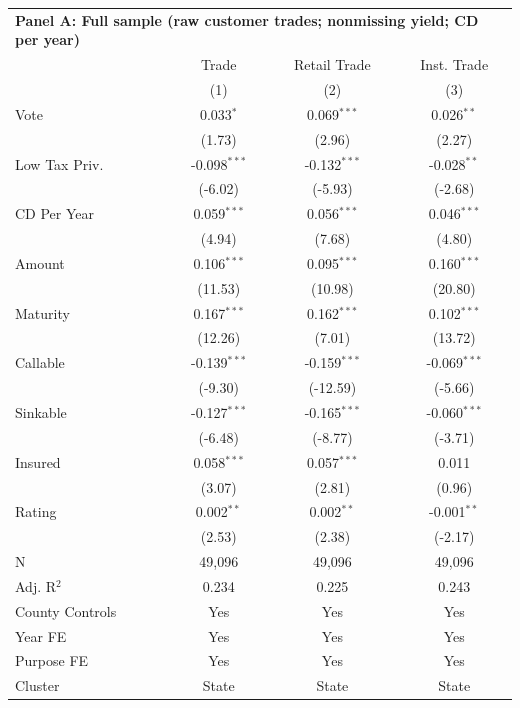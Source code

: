 \begingroup
\centering
\begin{tabular*}{\textwidth}{@{\extracolsep{\fill}}lccc}
\multicolumn{5}{l}{\textbf{Panel A: Full sample (raw customer trades; nonmissing yield; CD per year)}}\\

\addlinespace
   \toprule
                   & Trade          & Retail Trade   & Inst. Trade\\  
                   & (1)            & (2)            & (3)\\  
   \midrule 
   Vote            & 0.033$^{*}$    & 0.069$^{***}$  & 0.026$^{**}$\\   
                   & (1.73)        & (2.96)        & (2.27)\\   
   Low Tax Priv.   & -0.098$^{***}$ & -0.132$^{***}$ & -0.028$^{**}$\\   
                   & (-6.02)       & (-5.93)       & (-2.68)\\   
   CD Per Year     & 0.059$^{***}$  & 0.056$^{***}$  & 0.046$^{***}$\\   
                   & (4.94)        & (7.68)        & (4.80)\\   
   Amount          & 0.106$^{***}$  & 0.095$^{***}$  & 0.160$^{***}$\\   
                   & (11.53)       & (10.98)       & (20.80)\\   
   Maturity        & 0.167$^{***}$  & 0.162$^{***}$  & 0.102$^{***}$\\   
                   & (12.26)       & (7.01)        & (13.72)\\   
   Callable        & -0.139$^{***}$ & -0.159$^{***}$ & -0.069$^{***}$\\   
                   & (-9.30)       & (-12.59)      & (-5.66)\\   
   Sinkable        & -0.127$^{***}$ & -0.165$^{***}$ & -0.060$^{***}$\\   
                   & (-6.48)       & (-8.77)       & (-3.71)\\   
   Insured         & 0.058$^{***}$  & 0.057$^{***}$  & 0.011\\   
                   & (3.07)        & (2.81)        & (0.96)\\   
   Rating          & 0.002$^{**}$   & 0.002$^{**}$   & -0.001$^{**}$\\   
                   & (2.53)        & (2.38)        & (-2.17)\\   
   \hline
   N    & 49,096         & 49,096         & 49,096\\  
   Adj. R$^2$  & 0.234          & 0.225          & 0.243\\  
   County Controls & Yes            & Yes            & Yes\\  
   Year FE         & Yes            & Yes            & Yes\\  
   Purpose FE      & Yes            & Yes            & Yes\\  
   Cluster              & State & State & State\\  
   \bottomrule
\end{tabular*}
\par\endgroup
